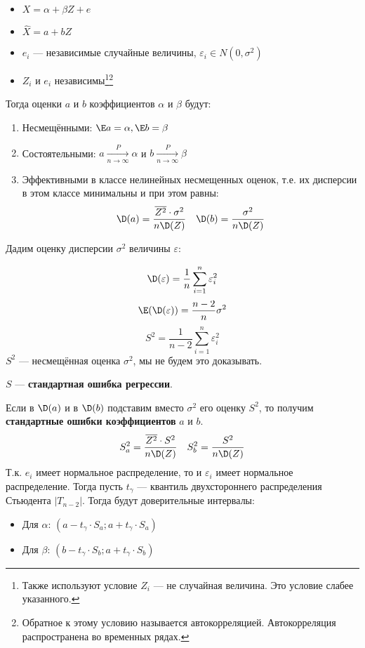 \begin{theorem}\itemfix
    \label{Гаусса--Маркова}
    \begin{itemize}
        \item \(X = \alpha + \beta Z + e\)
        \item \(\hat{X} = a + bZ\)
        \item \(e_i\) --- независимые случайные величины, \(\varepsilon_i \in N(0, \sigma^2)\)
        \item \(Z_i\) и \(e_i\) независимы\footnote{Также используют условие \(Z_i\) --- не случайная величина. Это условие слабее указанного.}\footnote{Обратное к этому условию называется автокорреляцией. Автокорреляция распространена во временных рядах.}
    \end{itemize}

    Тогда оценки \(a\) и \(b\) коэффициентов \(\alpha\) и \(\beta\) будут:
    \begin{enumerate}
        \item Несмещёнными: \(\E a = \alpha, \E b = \beta\)
        \item Состоятельными: \(a \xrightarrow[n \to \infty]{P} \alpha\) и \(b \xrightarrow[n \to \infty]{P} \beta\)
        \item Эффективными в классе нелинейных несмещенных оценок, т.е. их дисперсии в этом классе минимальны и при этом равны:
              \[\D(a) = \frac{\overline{Z^2} \cdot \sigma^2}{n \D(Z)} \quad \D(b) = \frac{\sigma^2}{n \D(Z)}\]
    \end{enumerate}
\end{theorem}

Дадим оценку дисперсии \(\sigma^2\) величины \(\varepsilon\):

\[\D(\varepsilon) = \frac{1}{n} \sum_{i=1}^{n} \varepsilon_i^2\]
\[\E(\D(\varepsilon)) = \frac{n - 2}{n}\sigma^2\]
\[S^2 = \frac{1}{n - 2}\sum_{i=1}^{n} \varepsilon_i^2\]
\(S^2\) --- несмещённая оценка \(\sigma^2\), мы не будем это доказывать.
\begin{definition}
    \(S\) --- \textbf{стандартная ошибка регрессии}.
\end{definition}
Если в \(\D(a)\) и в \(\D(b)\) подставим вместо \(\sigma^2\) его оценку \(S^2\), то получим \textbf{стандартные ошибки коэффициентов} \(a\) и \(b\).
\[S_a^2 = \frac{\overline{Z^2} \cdot S^2}{n \D(Z)} \quad S_b^2 = \frac{S^2}{n \D(Z)}\]
Т.к. \(e_i\) имеет нормальное распределение, то и \(\varepsilon_i\) имеет нормальное распределение. Тогда пусть \(t_\gamma\) --- квантиль двухстороннего распределения Стьюдента \(|T_{n-2}|\). Тогда будут доверительные интервалы:
\begin{itemize}
    \item Для \(\alpha\): \((a - t_\gamma \cdot S_a; a + t_\gamma \cdot S_a)\)
    \item Для \(\beta\): \((b - t_\gamma \cdot S_b; a + t_\gamma \cdot S_b)\)
\end{itemize}

